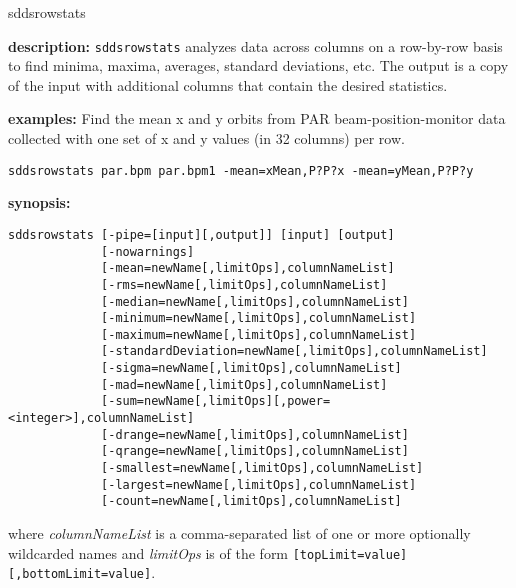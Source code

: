 \begin{sddsprog}{sddsrowstats}
  \item \textbf{description:}
    \verb|sddsrowstats| analyzes data across columns on a row-by-row basis to
    find minima, maxima, averages, standard deviations, etc. The output is a
    copy of the input with additional columns that contain the desired
    statistics.

  \item \textbf{examples:}
    Find the mean x and y orbits from PAR beam-position-monitor data collected
    with one set of x and y values (in 32 columns) per row.
    \begin{verbatim}
sddsrowstats par.bpm par.bpm1 -mean=xMean,P?P?x -mean=yMean,P?P?y
    \end{verbatim}

  \item \textbf{synopsis:}
    \begin{verbatim}
sddsrowstats [-pipe=[input][,output]] [input] [output]
             [-nowarnings]
             [-mean=newName[,limitOps],columnNameList]
             [-rms=newName[,limitOps],columnNameList]
             [-median=newName[,limitOps],columnNameList]
             [-minimum=newName[,limitOps],columnNameList]
             [-maximum=newName[,limitOps],columnNameList]
             [-standardDeviation=newName[,limitOps],columnNameList]
             [-sigma=newName[,limitOps],columnNameList]
             [-mad=newName[,limitOps],columnNameList]
             [-sum=newName[,limitOps][,power=<integer>],columnNameList]
             [-drange=newName[,limitOps],columnNameList]
             [-qrange=newName[,limitOps],columnNameList]
             [-smallest=newName[,limitOps],columnNameList]
             [-largest=newName[,limitOps],columnNameList]
             [-count=newName[,limitOps],columnNameList]
    \end{verbatim}
    where \emph{columnNameList} is a comma-separated list of one or more
    optionally wildcarded names and \emph{limitOps} is of the form
    \verb|[topLimit=value][,bottomLimit=value]|.


\end{sddsprog}
